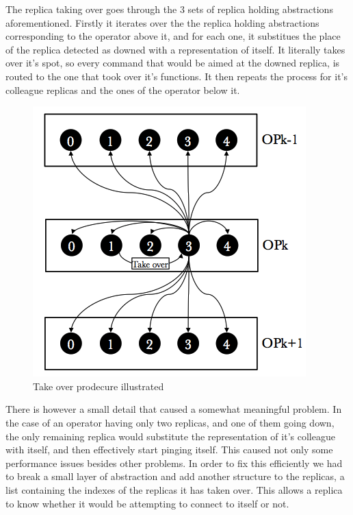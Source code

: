\documentclass[times, 10pt,twocolumn]{article}
\begin{document}

The replica taking over goes through the 3 sets of replica holding
abstractions aforementioned.  Firstly it iterates over the the replica
holding abstractions corresponding to the operator above it, and for each
one, it substitues the place of the replica detected as downed with a
representation of itself. It literally takes over it's spot, so every
command that would be aimed at the downed replica, is routed to the one
that took over it's functions.  It then repeats the process for it's
colleague replicas and the ones of the operator below it. 

\begin{figure}[h] \includegraphics[width=\columnwidth]{take_over}
	\caption{Take over prodecure illustrated} \end{figure}

There is however a small detail that caused a somewhat meaningful problem.
In the case of an operator having only two replicas, and one of them going
down, the only remaining replica would substitute the representation of
it's colleague with itself, and then effectively start pinging itself.
This caused not only some performance issues besides other problems.  In
order to fix this efficiently we had to break a small layer of abstraction
and add another structure to the replicas, a list containing the indexes
of the replicas it has taken over. This allows a replica to know whether
it would be attempting to connect to itself or not.
\end{document}
